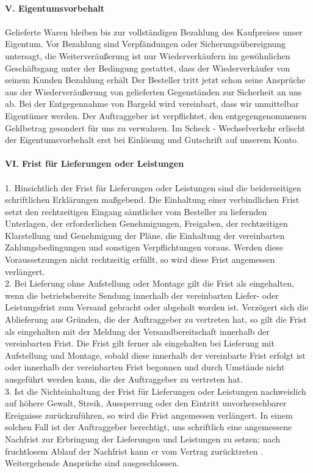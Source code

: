 \documentclass[9pt, oneside]{extletter}
\begin{document}
\begin{multicols}{3}
\\
\textbf{V. Eigentumsvorbehalt}\\
\\
Gelieferte Waren bleiben bis zur vollständigen Bezahlung des Kaufpreises unser Eigentum. Vor Bezahlung sind Verpfändungen oder Sicherungsübereignung untersagt, die Weiterveräußerung ist nur Wiederverkäufern im gewöhnlichen Geschäftsgang unter der Bedingung gestattet, dass der Wiederverkäufer von seinem Kunden Bezahlung erhält Der Besteller tritt jetzt schon seine Ansprüche aus der Wiederveräußerung von gelieferten Gegenständen zur Sicherheit an uns ab. Bei der Entgegennahme von Bargeld wird vereinbart, dass wir unmittelbar Eigentümer werden. Der Auftraggeber ist verpflichtet, den entgegengenommenen Geldbetrag gesondert für uns zu verwahren. Im Scheck - Wechselverkehr erlischt der Eigentumsvorbehalt erst bei Einlösung und Gutschrift auf unserem Konto.\\
\\
\textbf{VI. Frist für Lieferungen oder Leistungen}\\
\\
1. Hinsichtlich der Frist für Lieferungen oder Leistungen sind die beiderseitigen schriftlichen Erklärungen maßgebend. Die Einhaltung einer verbindlichen Frist setzt den rechtzeitigen Eingang sämtlicher vom Besteller zu liefernden Unterlagen, der erforderlichen Genehmigungen, Freigaben, der rechtzeitigen Klarstellung und Genehmigung der Pläne, die Einhaltung der vereinbarten Zahlungsbedingungen und sonstigen Verpflichtungen voraus. Werden diese Voraussetzungen nicht rechtzeitig erfüllt, so wird diese Frist angemessen verlängert.\\
2. Bei Lieferung ohne Aufstellung oder Montage gilt die Frist als eingehalten, wenn die betriebsbereite Sendung innerhalb der vereinbarten Liefer- oder Leistungsfrist zum Versand gebracht oder abgeholt worden ist. Verzögert sich die Ablieferung aus Gründen, die der Auftraggeber zu vertreten hat, so gilt die Frist als eingehalten mit der Meldung der Versandbereitschaft innerhalb der vereinbarten Frist. Die Frist gilt ferner als eingehalten bei Lieferung mit Aufstellung und Montage, sobald diese innerhalb der vereinbarte Frist erfolgt ist oder innerhalb der vereinbarten Frist begonnen und durch Umstände nicht ausgeführt werden kann, die der Auftraggeber zu vertreten hat.\\
3. Ist die Nichteinhaltung der Frist für Lieferungen oder Leistungen nachweislich auf höhere Gewalt, Streik, Aussperrung oder den Eintritt unvorhersehbarer Ereignisse zurückzuführen, so wird die Frist angemessen verlängert. In einem solchen Fall ist der Auftraggeber berechtigt, uns schriftlich eine angemessene Nachfrist zur Erbringung der Lieferungen und Leistungen zu setzen; nach fruchtlosem Ablauf der Nachfrist kann er vom Vertrag zurücktreten . Weitergehende Ansprüche sind ausgeschlossen.\\

\end{multicols}
\end{document}

